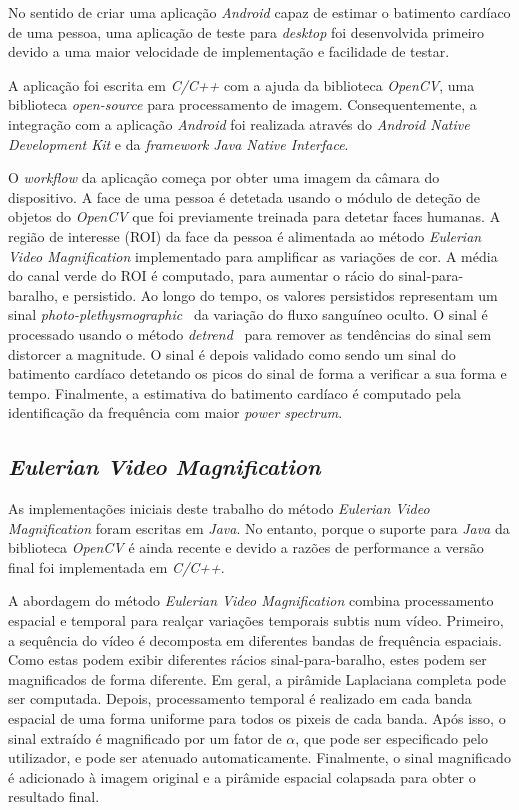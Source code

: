 \documentclass[9pt,a4paper]{extarticle}
\newcommand{\evm}{\emph{Eulerian Video Magnification}}
\begin{document}
\begin{multicols}{2}
No sentido de criar uma aplicação \emph{Android} capaz de estimar o batimento
cardíaco de uma pessoa, uma aplicação de teste para \emph{desktop} foi
desenvolvida primeiro devido a uma maior velocidade de implementação e
facilidade de testar.

A aplicação foi escrita em \emph{C/C++} com a ajuda da biblioteca \emph{OpenCV},
uma biblioteca \emph{open-source} para processamento de imagem.
Consequentemente, a integração com a aplicação \emph{Android} foi realizada
através do \emph{Android Native Development Kit} e da \emph{framework}
\emph{Java Native Interface}.

O \emph{workflow} da aplicação começa por obter uma imagem da câmara do
dispositivo. A face de uma pessoa é detetada usando o módulo de deteção
de objetos do \emph{OpenCV} que foi previamente treinada para detetar faces
humanas. A região de interesse (ROI) da face da pessoa é alimentada ao método
\evm{} implementado para amplificar as variações de cor. A média do canal
verde do ROI é computado, para aumentar o rácio do sinal-para-baralho,
e persistido. Ao longo do tempo, os valores persistidos representam um sinal
\emph{photo-plethysmographic}~\cite{Verkruysse2008Remote} da variação do fluxo
sanguíneo oculto. O sinal é processado usando o método
\emph{detrend}~\cite{Tarvainen2002Advanced} para remover as tendências do
sinal sem distorcer a magnitude. O sinal é depois validado
como sendo um sinal do batimento cardíaco detetando os picos do sinal
de forma a verificar a sua forma e tempo. Finalmente, a estimativa do
batimento cardíaco é computado pela identificação da frequência com maior
\emph{power spectrum}.

\subsection{\evm}\label{sec:work:evm}

As implementações iniciais deste trabalho do método \evm{} foram escritas
em \emph{Java}. No entanto, porque o suporte para \emph{Java} da biblioteca
\emph{OpenCV} é ainda recente e devido a razões de performance a versão
final foi implementada em \emph{C/C++}.

A abordagem do método \evm{} combina processamento espacial e temporal para
realçar variações temporais subtis num vídeo. Primeiro, a sequência do vídeo
é decomposta em diferentes bandas de frequência espaciais. Como estas podem
exibir diferentes rácios sinal-para-baralho, estes podem ser magnificados
de forma diferente. Em geral, a pirâmide Laplaciana
completa pode ser computada. Depois, processamento
temporal é realizado em cada banda espacial de uma forma uniforme para todos
os pixeis de cada banda. Após isso, o sinal extraído é magnificado por um
fator de $\alpha$, que pode ser especificado pelo utilizador, e pode ser
atenuado automaticamente. Finalmente, o sinal magnificado é adicionado à
imagem original e a pirâmide espacial colapsada para obter o resultado final.


\end{multicols}
\end{document}
